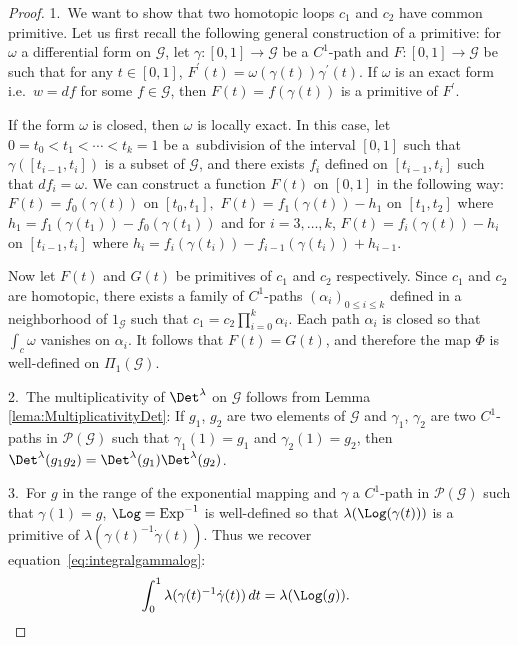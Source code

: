 \documentclass[pdftex]{sigma}
\DeclareMathOperator{\Exp}{Exp} \DeclareMathOperator{\rk}{rk}
\begin{document}
\begin{proof}
1.~We want to show that two homotopic loops $c_1$ and $c_2$ have common primitive. Let us f\/irst recall the following general construction of a  primitive: for $\omega$ a dif\/ferential form on ${\mathcal{G}}$, let  $\gamma:[0,1]\to {\mathcal{G}}$ be a $C^1$-path and $F:[0,1]\to {\mathcal{G}}$  be such that for any $t\in [0,1]$, $F^\prime(t)=\omega(\gamma(t))\gamma^\prime(t).$ If $\omega$ is an exact form i.e.\ $w=df$ for some $f\in\mathcal{G}$, then $F(t)=f(\gamma(t))$ is a primitive of $F^\prime.$

 If the form $\omega$ is closed, then $\omega$ is locally exact. In this case, let $0=t_0<t_1<\cdots<t_k=1$ be a~subdivision of the interval $[0,1]$ such that $\gamma([t_{i-1},t_i])$ is a subset of ${\mathcal{G}}$, and there exists $f_i$ def\/ined on $[t_{i-1},t_i]$ such that $df_i=\omega$. We can construct a function $F(t)$ on $[0,1]$ in the following way: $F(t)=f_0(\gamma(t))$ on $[t_0,t_1],$ $F(t)=f_1(\gamma(t))-h_1$ on $[t_{1},t_2]$ where $h_1=f_1(\gamma(t_1))-f_{0}(\gamma(t_1))$ and for $i=3,\dots,k$, $F(t)=f_i(\gamma(t))-h_i$ on $[t_{i-1},t_i]$ where $h_i=f_i(\gamma(t_i))-f_{i-1}(\gamma(t_i))+h_{i-1}$.

Now let $F(t)$ and $G(t)$ be primitives  of $c_1$ and $c_2$ respectively. Since $c_1$ and $c_2$ are homotopic, there exists a family of $C^1$-paths $(\alpha_i)_{0\leq i\leq k}$ def\/ined in a neighborhood of $1_{\mathcal{G}}$ such that $c_1=c_2\prod\limits_{i=0}^k\alpha_i$. Each path $\alpha_i$ is closed so that $\int_c\omega$  vanishes on $\alpha_i$. It follows that $F(t)=G(t)$, and therefore the map $\Phi$ is well-def\/ined on $\Pi_1({\mathcal{G}}).$

 2.~The multiplicativity of $\Det^\lambda$ on ${\mathcal{G}}$ follows from Lemma \ref{lema:MultiplicativityDet}: If $g_1$, $g_2$ are two elements of ${\mathcal{G}}$ and $\gamma_1$, $\gamma_2$ are two $C^1$-paths in ${\mathcal{P}}(\mathcal{G})$ such that $\gamma_1(1)= g_1$ and $\gamma_2(1)= g_2$, then $\Det^\lambda(g_1g_2)=\Det^\lambda(g_1)\Det^\lambda(g_2)$.

 3.~For $g$ in the range of the exponential mapping and $\gamma$ a $C^1$-path in ${\mathcal{P}}(\mathcal{G})$ such that $\gamma(1)= g$, ${\Log}= {\Exp}^{-1}$ is well-def\/ined so that $\lambda({\Log}(\gamma(t)))$ is a primitive of $\lambda(\gamma(t)^{-1}\dot{\gamma}(t))$. Thus we recover equation~\eqref{eq:integralgammalog}:
\begin{gather*}
\int_0^1\lambda(\gamma(t)^{-1}\dot{\gamma}(t))\,dt=\lambda({\Log}(g)).\tag*{\qed}
\end{gather*}
\renewcommand{\qed}{}
\end{proof}
\end{document}
